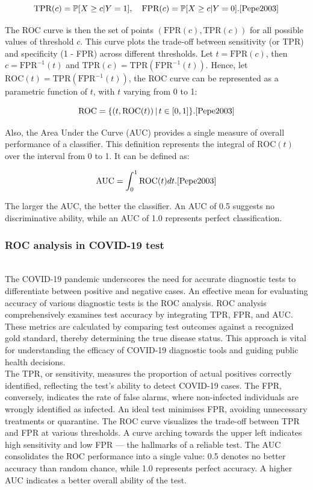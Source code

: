 \documentclass{article}\usepackage[]{graphicx}\usepackage[]{xcolor}
\numberwithin{equation}{section}
\begin{document}
\[ \text{TPR}(c) = \mathbb{P}[X \geq c | Y = 1], \quad \text{FPR}(c) = \mathbb{P}[X \geq c | Y = 0].\cite{Pepe2003}\]

\noindent
The ROC curve is then the set of points $(\text{FPR}(c), \text{TPR}(c))$ for all possible values of threshold $c$. This curve plots the trade-off between sensitivity (or TPR) and specificity (1 - FPR) across different thresholds. Let $t=\text{FPR}(c)$, then $c = \text{FPR}^{-1}(t)$ and $\text{TPR}(c)= \text{TPR}(\text{FPR}^{-1}(t))$. Hence, let $\text{ROC}(t)= \text{TPR}(\text{FPR}^{-1}(t))$, the ROC curve can be represented as a parametric function of $t$, with $t$ varying from 0 to 1:

\[ \text{ROC} = \{ (t, \text{ROC}(t)) \,|\, t \in [0, 1] \}.\cite{Pepe2003} \]

\noindent
Also, the Area Under the Curve (AUC) provides a single measure of overall performance of a classifier. This definition represents the integral of $\text{ROC}(t)$ over the interval from 0 to 1. It can be defined as:

\[ \text{AUC} = \int_{0}^{1} \text{ROC}(t) dt.\cite{Pepe2003} \]

\noindent
The larger the AUC, the better the classifier. An AUC of 0.5 suggests no discriminative ability, while an AUC of 1.0 represents perfect classification.\\

\noindent 
\subsubsection{ROC analysis in COVID-19 test}\\
The COVID-19 pandemic underscores the need for accurate diagnostic tests to differentiate between positive and negative cases\cite{Garcia2021ROCAlly}. An effective mean for evaluating accuracy of various diagnostic tests is the ROC analysis. ROC analysis comprehensively examines test accuracy by integrating TPR, FPR, and AUC. These metrics are calculated by comparing test outcomes against a recognized gold standard, thereby determining the true disease status. This approach is vital for understanding the efficacy of COVID-19 diagnostic tools and guiding public health decisions.\\

\noindent
The TPR, or sensitivity, measures the proportion of actual positives correctly identified, reflecting the test's ability to detect COVID-19 cases. The FPR, conversely, indicates the rate of false alarms, where non-infected individuals are wrongly identified as infected. An ideal test minimises FPR, avoiding unnecessary treatments or quarantine. The ROC curve visualizes the trade-off between TPR and FPR at various thresholds. A curve arching towards the upper left indicates high sensitivity and low FPR — the hallmarks of a reliable test. The AUC consolidates the ROC performance into a single value: 0.5 denotes no better accuracy than random chance, while 1.0 represents perfect accuracy. A higher AUC indicates a better overall ability of the test.\\
\end{document}
